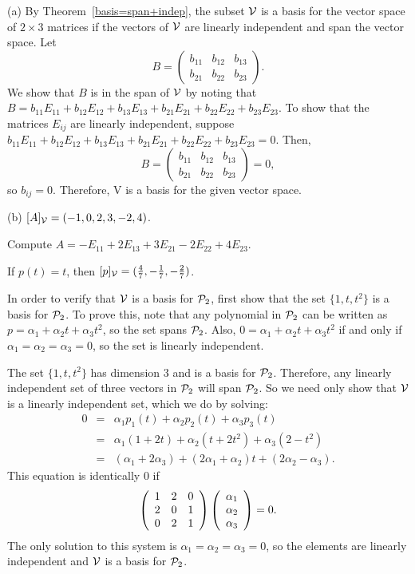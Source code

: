 \documentclass{ximera}
\begin{document}
(a) By Theorem~\ref{basis=span+indep},
the subset ${\cal V}$ is a basis for the vector space of $2 \times
3$ matrices if the vectors of ${\cal V}$ are linearly independent and
span the vector space.  Let
\[ B = \left(\begin{array}{rrr} b_{11} & b_{12} & b_{13} \\ b_{21} &
b_{22} & b_{23} \end{array}\right). \]
We show that $B$ is in the span of ${\cal V}$ by noting that
$B = b_{11}E_{11} + b_{12}E_{12} + b_{13}E_{13} + b_{21}E_{21}
+ b_{22}E_{22} + b_{23}E_{23}$.  To show that the matrices $E_{ij}$
are linearly independent, suppose $b_{11}E_{11} + b_{12}E_{12} +
b_{13}E_{13} + b_{21}E_{21} + b_{22}E_{22} + b_{23}E_{23} = 0$.  Then,
\[  B = \left(\begin{array}{rrr} b_{11} & b_{12} & b_{13} \\ b_{21} &
b_{22} & b_{23} \end{array}\right) = 0, \]
so $b_{ij} = 0$.
Therefore, {\cal V} is a basis for the given vector space.

(b) \ans $[A]_{\cal V} = (-1,0,2,3,-2,4)$.

\soln Compute $A = -E_{11} + 2E_{13} + 3E_{21} - 2E_{22} + 4E_{23}$.

\ans If $p(t) = t$, then
$[p]_{\cal V} = (\frac{4}{7}, -\frac{1}{7}, -\frac{2}{7})$.

\soln In order to verify that ${\cal V}$ is a basis for ${\cal P}_2$, first
show that the set $\{1,t,t^2\}$ is a basis for ${\cal P}_2$.  To prove
this, note that any polynomial in ${\cal P}_2$ can be written as
$p = \alpha_1 + \alpha_2t + \alpha_3t^2$, so the set spans ${\cal P}_2$.
Also, $0 = \alpha_1 + \alpha_2t + \alpha_3t^2$ if and only if
$\alpha_1 = \alpha_2 = \alpha_3 = 0$, so the set is linearly
independent.

\para The set $\{1,t,t^2\}$ has dimension 3 and is a basis for
${\cal P}_2$.  Therefore, any linearly independent set of three vectors
in ${\cal P}_2$ will span ${\cal P}_2$.  So we need only show that
${\cal V}$ is a linearly independent set, which we do by solving:
\[
\begin{array}{rcl}
0 & = & \alpha_1p_1(t) + \alpha_2p_2(t) + \alpha_3p_3(t) \\
& = & \alpha_1(1 + 2t) + \alpha_2(t + 2t^2) + \alpha_3(2 - t^2) \\
& = & (\alpha_1 + 2\alpha_3) + (2\alpha_1 + \alpha_2)t +
(2\alpha_2 - \alpha_3). \end{array}
\]
This equation is identically $0$ if
\[
\left(\begin{array}{rrr} 1 & 2 & 0 \\ 2 & 0 & 1 \\ 0 & 2 & 1\end{array}\right)\left(\begin{array}{r} \alpha_1 \\ \alpha_2 \\ \alpha_3\end{array}\right) = 0.
\]
The only solution to this system is $\alpha_1 = \alpha_2 = \alpha_3
 = 0$, so the elements are linearly independent and ${\cal V}$ is
a basis for ${\cal P}_2$.
\end{document}

